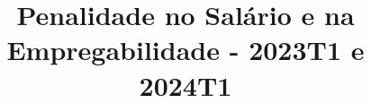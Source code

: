 \documentclass{article}
\begin{document}
	
	\title{Penalidade no Salário e na Empregabilidade - 2023T1 e 2024T1}
	\maketitle
	
	\begin{flushleft} %
\end{flushleft} %
	
	
\end{document}
